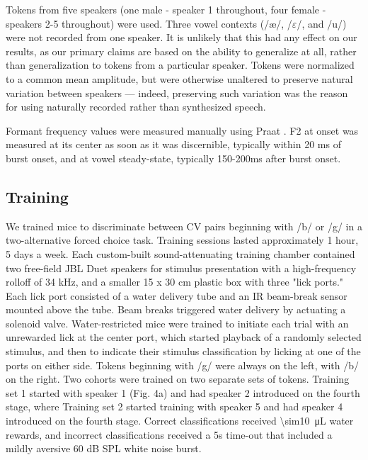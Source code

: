Tokens from five speakers (one male - speaker 1 throughout, four female - speakers 2-5 throughout) were used. Three vowel contexts (/\ae/, /$\varepsilon$/, and /u/) were not recorded from one speaker. It is unlikely that this had any effect on our results, as our primary claims are based on the ability to generalize at all, rather than generalization to tokens from a particular speaker. Tokens were normalized to a common mean amplitude, but were otherwise unaltered to preserve natural variation between speakers --- indeed, preserving such variation was the reason for using naturally recorded rather than synthesized speech.

Formant frequency values were measured manually using Praat \citep{Boersma2001}. F2 at onset was measured at its center as soon as it was discernible, typically within 20 ms of burst onset, and at vowel steady-state, typically 150-200ms after burst onset.

\subsection{Training}

We trained mice to discriminate between CV pairs beginning with /b/ or /g/ in a two-alternative forced choice task. Training sessions lasted approximately 1 hour, 5 days a week. Each custom-built sound-attenuating training chamber contained two free-field JBL Duet speakers for stimulus presentation with a high-frequency rolloff of 34 kHz, and a smaller 15 x 30 cm plastic box with three "lick ports." Each lick port consisted of a water delivery tube and an IR beam-break sensor mounted above the tube. Beam breaks triggered water delivery by actuating a solenoid valve. Water-restricted mice were trained to initiate each trial with an unrewarded lick at the center port, which started playback of a randomly selected stimulus, and then to indicate their stimulus classification by licking at one of the ports on either side. Tokens beginning with /g/ were always on the left, with /b/ on the right. Two cohorts were trained on two separate sets of tokens. Training set 1 started with speaker 1 (Fig. 4a) and had speaker 2 introduced on the fourth stage, where Training set 2 started training with speaker 5 and had speaker 4 introduced on the fourth stage. Correct classifications received \SI{\sim10}{\micro\liter} water rewards, and incorrect classifications received a 5s time-out that included a mildly aversive 60 dB SPL white noise burst.

